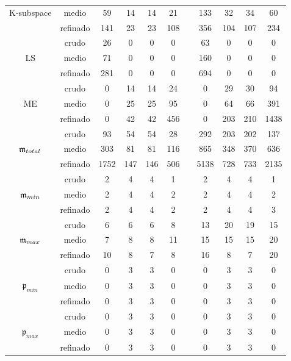 \begin{table}
\begin{adjustbox}{width=0.95\columnwidth,center}
\begin{tabular}{ccccccccccc}
			K-subspace & medio & 59 & 14 & 14 & 21 &  & 133 & 32 & 34 & 60 \\
			& refinado & 141 & 23 & 23 & 108 &  & 356 & 104 & 107 & 234 \\
			\hline
			& crudo & 26 & 0 & 0 & 0 &  & 63 & 0 & 0 & 0 \\
			LS & medio & 71 & 0 & 0 & 0 &  & 160 & 0 & 0 & 0 \\
			& refinado & 281 & 0 & 0 & 0 &  & 694 & 0 & 0 & 0 \\
			\hline
			& crudo & 0 & 14 & 14 & 24 &  & 0 & 29 & 30 & 94 \\
			ME & medio & 0 & 25 & 25 & 95 &  & 0 & 64 & 66 & 391 \\
			& refinado & 0 & 42 & 42 & 456 &  & 0 & 203 & 210 & 1438 \\
			\hline
			& crudo & 93 & 54 & 54 & 28 &  & 292 & 203 & 202 & 137 \\
			$\mathfrak{m}_{total}$ & medio & 303 & 81 & 81 & 116 &  & 865 & 348 & 370 & 636 \\
			& refinado & 1752 & 147 & 146 & 506 &  & 5138 & 728 & 733 & 2135 \\
			\hline
			& crudo & 2 & 4 & 4 & 1 &  & 2 & 4 & 4 & 1 \\
			$\mathfrak{m}_{min}$ & medio & 2 & 4 & 4 & 2 &  & 2 & 4 & 4 & 2 \\
			& refinado & 2 & 4 & 4 & 2 &  & 2 & 4 & 4 & 3 \\
			\hline
			& crudo & 6 & 6 & 6 & 8 &  & 13 & 20 & 19 & 15 \\
			$\mathfrak{m}_{max}$ & medio & 7 & 8 & 8 & 11 &  & 15 & 15 & 15 & 20 \\
			& refinado & 10 & 8 & 7 & 8 &  & 16 & 8 & 7 & 20 \\
			\hline
			& crudo & 0 & 3 & 3 & 0 &  & 0 & 3 & 3 & 0 \\
			$\mathfrak{p}_{min}$ & medio & 0 & 3 & 3 & 0 &  & 0 & 3 & 3 & 0 \\
			& refinado & 0 & 3 & 3 & 0 &  & 0 & 3 & 3 & 0 \\
			\hline
			& crudo & 0 & 3 & 3 & 0 &  & 0 & 3 & 3 & 0 \\
			$\mathfrak{p}_{max}$ & medio & 0 & 3 & 3 & 0 &  & 0 & 3 & 3 & 0 \\
			& refinado & 0 & 3 & 3 & 0 &  & 0 & 3 & 3 & 0 \\
			\hline
		\end{tabular}
	\end{adjustbox}
\end{table}

